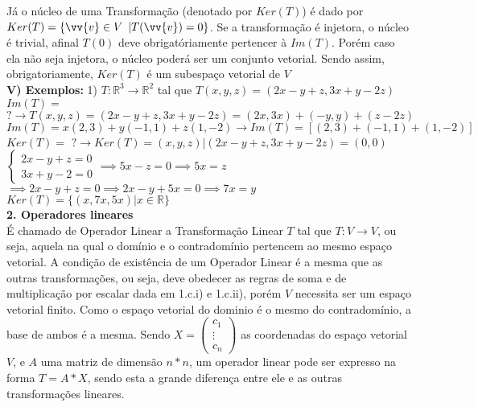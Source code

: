 \documentclass[11pt,a4paper]{article}
\newcommand\tab[1][1.835cm]{\hspace*{#1}}
\newcommand\taba[1][2.55cm]{\hspace*{#1}}
\begin{document}
\begin{flushleft}
\tab Já o núcleo de uma Transformação (denotado por $Ker(T)$) é dado por $Ker(T) = \{ \vv{v} \in V $ $ | T(\vv{v}) = 0\}$. Se a transformação é injetora, o núcleo é trivial, afinal $T(0)$ deve obrigatóriamente pertencer à $Im(T)$. Porém caso ela não seja injetora, o núcleo poderá ser um conjunto vetorial. Sendo assim, obrigatoriamente, $Ker(T)$ é um subespaço vetorial de $V$ \linebreak
\\
\tab \textbf{V) Exemplos:} \linebreak
\taba 1) $T: \mathbb{R}^3 \rightarrow \mathbb{R}^2$ tal que $T(x,y,z) = (2x-y+z, 3x+y-2z)$ \linebreak
\taba $Im(T) =$ $ ? \rightarrow T(x,y,z) = (2x-y+z, 3x+y-2z) = (2x,3x) + (-y,y) + (z-2z)$ \linebreak
\taba $Im(T) = x(2,3) + y(-1,1) + z(1,-2) \rightarrow Im(T) = [(2,3) + (-1,1) + (1,-2)]$ \linebreak
\newline
\taba $Ker(T) = $ $? \rightarrow Ker(T) = {(x,y,z)|(2x-y+z,3x+y-2z) = (0,0)}$ \linebreak
\taba $\begin{cases}
    2x-y+z=0\\
    3x+y-2=0
  \end{cases} \implies 5x-z = 0 \implies 5x = z$
  \newline
  \newline \taba \hspace{3.15cm} $\implies 2x-y+z =0 \implies 2x-y+5x =0 \implies 7x = y$
  \newline
  \newline \taba $Ker(T) = \{(x,7x,5x) | x \in \mathbb{R}\}$
\\
\textbf{2. Operadores lineares}\linebreak
\\
\tab É chamado de Operador Linear a Transformação Linear $T$ tal que $T: V \rightarrow V$, ou seja, aquela na qual o domínio e o contradomínio pertencem ao mesmo espaço vetorial.\linebreak
\tab A condição de existência de um Operador Linear é a mesma que as outras transformações, ou seja, deve obedecer as regras de soma e de multiplicação por escalar dada em 1.c.i) e 1.c.ii), porém $V$ necessita ser um espaço vetorial finito. Como o espaço vetorial do dominio é o mesmo do contradomínio, a base de ambos é a mesma.\linebreak
\tab Sendo $X = \begin{pmatrix} c_1 \\ \vdots \\ c_n \end{pmatrix}$ as coordenadas do espaço vetorial $V$, e $A$ uma matriz de dimensão $n*n$, um operador linear pode ser expresso na forma $T = A*X$, sendo esta a grande diferença entre ele e as outras transformações lineares. \linebreak

\end{flushleft}
\end{document}
